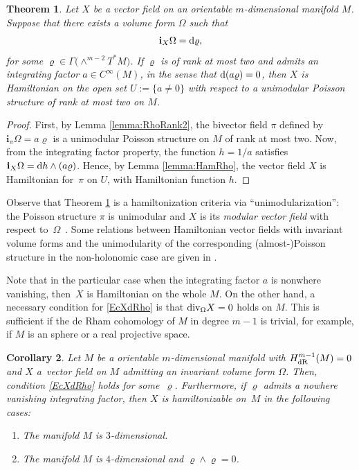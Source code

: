 \documentclass[10pt,a4paper]{amsart}
\newcommand{\dd}{{\rm d}}
\newcommand{\ii}{\mathbf{i}}
\numberwithin{equation}{section}
\newtheorem{Theorem}{Theorem}[section]
\newtheorem{Corollary}[Theorem]{Corollary}
\begin{document}
\begin{Theorem}\label{teo:UnimodHam}
Let $X$ be a vector field on an orientable $m$-dimensional manifold $M$. Suppose that there exists a volume form $\Omega$ such that
 \begin{equation}\label{EcXdRho}
 \ii_{X}\Omega = \dd\varrho,
 \end{equation}
for some $\varrho \in \Gamma\big({\wedge}^{m-2}T^{*}M\big)$. If $\varrho$ is of rank at most two and admits an integrating factor $a \in C^{\infty}(M)$, in the sense that $\dd(a\varrho) = 0$, then $X$ is Hamiltonian on the open set $U := \{a \neq 0\}$ with respect to a unimodular Poisson structure of rank at most two on $M$.
\end{Theorem}
\begin{proof}
First, by Lemma \ref{lemma:RhoRank2}, the bivector field $\pi$ defined by $\ii_{\pi}\Omega = a\varrho$ is a unimodular Poisson structure on $M$ of rank at most two. Now, from the integrating factor property, the function $h = {1}/{a}$ satisfies $\ii_{X}\Omega = \dd{h} \wedge (a\varrho)$. Hence, by Lemma \ref{lemma:HamRho}, the vector field $X$ is Hamiltonian for~$\pi$ on $U$, with Hamiltonian function $h$.
\end{proof}

\begin{Remark}
Observe that Theorem \ref{teo:UnimodHam} is a hamiltonization criteria via ``unimodularization'': the Poisson structure $\pi$ is unimodular and $X$ is its \emph{modular vector field} with respect to~$\Omega$~\cite{We-97}. Some relations between Hamiltonian vector fields with invariant volume forms and the unimodularity of the corresponding (almost-)Poisson structure in the non-holonomic case are given in \cite{FGM-15}.
\end{Remark}

Note that in the particular case when the integrating factor $a$ is nonwhere vanishing, then~$X$ is Hamiltonian on the whole $M$. On the other hand, a necessary condition for \eqref{EcXdRho} is that ${\rm div}_{\Omega}{X} = 0$ holds on $M$. This is sufficient if the de Rham cohomology of $M$ in degree $m-1$ is trivial, for example, if $M$ is an sphere or a real projective space.

\begin{Corollary}
Let $M$ be a orientable $m$-dimensional manifold with $H^{m-1}_{{\rm dR}}(M) = 0$ and $X$ a~vector field on $M$ admitting an invariant volume form $\Omega$. Then, condition \eqref{EcXdRho} holds for some~$\varrho$. Furthermore, if $\varrho$ admits a nowhere vanishing integrating factor, then $X$ is hamiltonizable on~$M$ in the following cases:
 \begin{enumerate}\itemsep=0pt
 \item[$(a)$] The manifold $M$ is $3$-dimensional.
 \item[$(b)$] The manifold $M$ is $4$-dimensional and $\varrho \wedge \varrho = 0$.
 \end{enumerate}
\end{Corollary}
\end{document}
